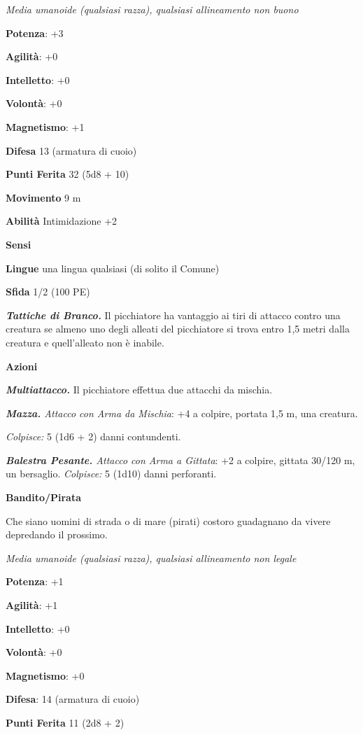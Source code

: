 \begin{multicols}{2}
\emph{Media umanoide (qualsiasi razza), qualsiasi allineamento non
buono}

\textbf{Potenza}: +3

\textbf{Agilità}: +0

\textbf{Intelletto}: +0

\textbf{Volontà}: +0

\textbf{Magnetismo}: +1

\textbf{Difesa} 13 (armatura di cuoio)

\textbf{Punti Ferita} 32 (5d8 + 10)

\textbf{Movimento} 9 m

\textbf{Abilità} Intimidazione +2

\textbf{Sensi} 

\textbf{Lingue} una lingua qualsiasi (di solito il Comune)

\textbf{Sfida} 1/2 (100 PE)

\emph{\textbf{Tattiche di Branco.}} Il picchiatore ha vantaggio ai tiri
di attacco contro una creatura se almeno uno degli alleati del
picchiatore si trova entro 1,5 metri dalla creatura e quell'alleato non
è inabile.

\textbf{Azioni}

\emph{\textbf{Multiattacco.}} Il picchiatore effettua due attacchi da
mischia.

\emph{\textbf{Mazza.} Attacco con Arma da Mischia}: +4 a colpire,
portata 1,5 m, una creatura.

\emph{Colpisce:} 5 (1d6 + 2) danni contundenti.

\emph{\textbf{Balestra Pesante.} Attacco con Arma a Gittata}: +2 a
colpire, gittata 30/120 m, un bersaglio. \emph{Colpisce:} 5 (1d10) danni
perforanti.

\textbf{Bandito/Pirata}

Che siano uomini di strada o di mare (pirati) costoro guadagnano da
vivere depredando il prossimo.

\emph{Media umanoide (qualsiasi razza), qualsiasi allineamento non
legale}

\textbf{Potenza}: +1

\textbf{Agilità}: +1

\textbf{Intelletto}: +0

\textbf{Volontà}: +0

\textbf{Magnetismo}: +0

\textbf{Difesa}: 14 (armatura di cuoio)

\textbf{Punti Ferita} 11 (2d8 + 2)


\end{multicols}
